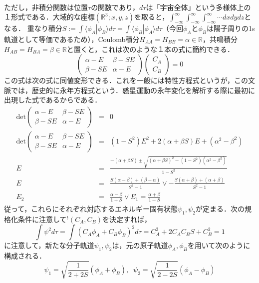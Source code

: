 \documentclass[uplatex, dvipdfmx]{jsreport}
\begin{document}
\begin{example}
\begin{eqnarray*}
    \end{eqnarray*}
    ただし，非積分関数は位置$\tau$の関数であり，$d\tau$は「宇宙全体」という多様体上の１形式である．大域的な座標$(\mathbb{R}^3;x,y,z)$を取ると，$\int^\infty_{-\infty}\int^\infty_{-\infty}\int^\infty_{-\infty}\cdots dxdydz$となる．
    重なり積分$S:=\int \langle\phi_A|\phi_B\rangle d\tau =\int \langle\phi_B|\phi_A\rangle d\tau$（今回$\phi_A$と$\phi_B$は陽子周りの1s軌道として等価であるため），Coulomb積分$H_{AA}=H_{BB}=\alpha\in\mathbb{R}$，共鳴積分$H_{AB}=H_{BA}=\beta\in\mathbb{R}$と置くと，これは次のような１本の式に簡約できる．
    \[ \left(\begin{array}{cc}\alpha-E &\beta-SE \\ \beta-SE & \alpha-E \end{array}\right) \left(\begin{array}{c}C_A\\C_B\end{array}\right)=0\]
    この式は次の式に同値変形できる．これを一般には特性方程式というが，この文脈では，歴史的に永年方程式という．惑星運動の永年変化を解析する際に最初に出現した式であるからである．
    \begin{eqnarray*}
        \mathrm{det}\left(\begin{array}{cc}\alpha-E &\beta-SE \\ \beta-SE & \alpha-E \end{array}\right) &=& 0 \\
        \mathrm{det}\left(\begin{array}{cc}\alpha-E &\beta-SE \\ \beta-SE & \alpha-E \end{array}\right) &=& (1-S^2)E^2+2(\alpha+\beta S)E+(\alpha^2-\beta^2) \\
        E &=& \frac{-(\alpha+\beta S)\pm\sqrt{(\alpha+\beta S)^2-(1-S^2)(\alpha^2-\beta^2)}}{1-S^2} \\
        E &=& \frac{S(\alpha-\beta)+(\beta-\alpha)}{S^2-1}\lor -\frac{S(\alpha+\beta)+(\alpha+\beta)}{S^2-1} \\
        E_2 &=& \frac{\alpha-\beta}{1+S} \lor E_1= \frac{\alpha+\beta}{1-S}
    \end{eqnarray*}
    従って，これらにそれぞれ対応するエネルギー固有状態$\psi_1,\psi_2$が定まる．次の規格化条件に注意して${}^t(C_A,C_B)$を決定すれば，
    \[ \int\psi^2d\tau = \int(C_A\phi_A+C_B\phi_B)^2d\tau = C_A^2+2C_AC_BS+C_B^2=1 \]
    に注意して，新たな分子軌道$\psi_1,\psi_2$は，元の原子軌道$\phi_A,\phi_B$を用いて次のように構成される．
    \[ \psi_1=\sqrt{\frac{1}{2+2S}}(\phi_A+\phi_B),\;\;\psi_2=\sqrt{\frac{1}{2-2S}}(\phi_A-\phi_B) \]
    

\end{example}
\end{document}
